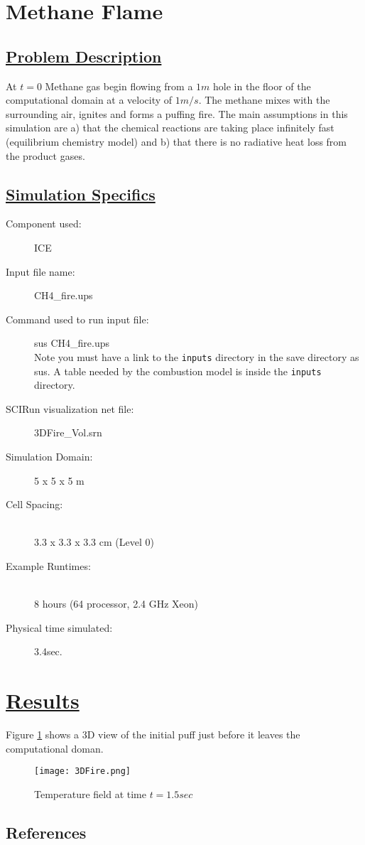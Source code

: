 
\section*{\center Methane Flame}
\subsection*{\underline{Problem Description}}
At $t=0$ Methane gas begin flowing from a $1m$ hole in the floor of the
computational domain at a velocity of $1m/s$.  The methane mixes with the
surrounding air, ignites and forms a puffing fire.  The main assumptions in
this simulation are a) that the chemical reactions are taking place infinitely
fast (equilibrium chemistry model) and b) that there is no radiative heat
loss from the product gases.
\subsection*{\underline{Simulation Specifics}}
\begin{description} 
\item [Component used:] \hfill ICE
\item [Input file name:] \hfill CH4\_fire.ups
\item [Command used to run input file:]\hfill sus CH4\_fire.ups \\
Note you must have a link to the {\tt inputs} directory in the save directory as sus.  A table needed
by the combustion model is inside the {\tt inputs} directory.
\item [SCIRun visualization net file:]\hfill 3DFire\_Vol.srn \\


\item [Simulation Domain:]\hfill    5 x 5 x 5 m
\item [Cell Spacing:]\hfill \\ 
3.3 x 3.3 x 3.3 cm (Level 0)


\item [Example Runtimes:] \hfill \\
 8 hours   (64 processor, 2.4 GHz Xeon)

\item [Physical time simulated:] \hfill 3.4sec.

\end{description}

\section*{\underline{Results}}
Figure \ref{results.CH4} shows a 3D view of the initial puff just before it leaves the computational
doman.  
\begin{figure}
\texttt{[image: 3DFire.png]}
\caption{Temperature field at time $t = 1.5 sec$}
\label{results.CH4}
\end{figure}
\newpage


\subsection{References}



